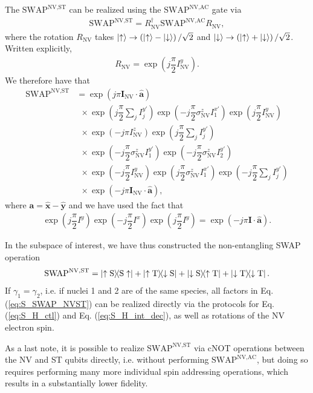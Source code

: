 \documentclass[twocolumn]{revtex4-1}
\renewcommand{\t}{\text} %
\newcommand{\f}[2]{\dfrac{#1}{#2}} %
\newcommand{\p}[1]{\left(#1\right)} %
\renewcommand{\v}{\bm} %
\newcommand{\uv}[1]{\hat{\v{#1}}} %
\renewcommand{\c}{\cdot} %
\renewcommand{\u}{\uparrow}
\renewcommand{\d}{\downarrow}
\newcommand{\SWAP}{\t{SWAP}}
\newcommand{\NV}{\t{NV}}
\newcommand{\AC}{\t{AC}}
\newcommand{\ST}{\t{ST}}
\renewcommand{\S}{\t{S}}
\newcommand{\T}{\t{T}}
\begin{document}
The $\SWAP^{\NV,\ST}$ can be realized using the $\SWAP^{\NV,\AC}$ gate
via
\begin{align}
  \SWAP^{\NV,\ST} = R_\NV^\dagger \SWAP^{\NV,\AC} R_\NV,
\end{align}
where the rotation $R_\NV$ takes $\ket\u\to\p{\ket\u-\ket\d}/\sqrt2$
and $\ket\d\to\p{\ket\u+\ket\d}/\sqrt2$. Written explicitly,
\begin{align}
  R_\NV = \exp\p{j\f\pi2 I_\NV^y}.
\end{align}
We therefore have that
\begin{align}
  \SWAP^{\NV,\ST}
  &= \exp\p{j\pi\v I_\NV\c\uv a} \tag*{} \\
  &~~\times \exp\p{j\f\pi2\sum_jI_j^{y'}}
    \exp\p{-j\f\pi2 \sigma_\NV^z I_1^{x'}}
    \exp\p{j\f\pi2 I_\NV^y} \tag*{} \\
  &~~\times \exp\p{-j\pi I_\NV^z}
    \exp\p{j\f\pi2\sum_jI_j^{y'}} \tag*{} \\
  &~~\times \exp\p{-j\f\pi2 \sigma_\NV^z I_1^{y'}}
    \exp\p{-j\f\pi2 \sigma_\NV^z I_2^{y'}} \tag*{} \\
  &~~\times \exp\p{-j\f\pi2 I_\NV^y}
    \exp\p{j\f\pi2 \sigma_\NV^z I_1^{x'}}
    \exp\p{-j\f\pi2\sum_jI_j^{y'}} \tag*{} \\
  &~~\times \exp\p{-j\pi\v I_\NV\c\uv a},
    \label{eq:S_SWAP_NVST}
\end{align}
where $\v a = \uv x - \uv y$ and we have used the fact that
\begin{align}
  \exp\p{j\f\pi2 I^y} \exp\p{-j\f\pi2 I^x}
  \exp\p{j\f\pi2 I^y}
  = \exp\p{-j\pi\v I\c\uv a}.
\end{align}

In the subspace of interest, we have thus constructed the
non-entangling SWAP operation
\begin{align}
  \SWAP^{\NV,\ST} = \op{\u\S}{\S\u} + \op{\u\T}{\d\S}
  + \op{\d\S}{\u\T} + \op{\d\T}{\d\T}.
\end{align}
If $\gamma_1=\gamma_2$, i.e. if nuclei 1 and 2 are of the same
species, all factors in Eq. (\ref{eq:S_SWAP_NVST}) can be realized
directly via the protocols for Eq. (\ref{eq:S_H_ctl}) and
Eq. (\ref{eq:S_H_int_dec}), as well as rotations of the NV electron
spin.

As a last note, it is possible to realize $\SWAP^{\NV,\ST}$ via cNOT
operations between the NV and ST qubits directly, i.e. without
performing $\SWAP^{\NV,\AC}$, but doing so requires performing many
more individual spin addressing operations, which results in a
substantially lower fidelity.
\end{document}
